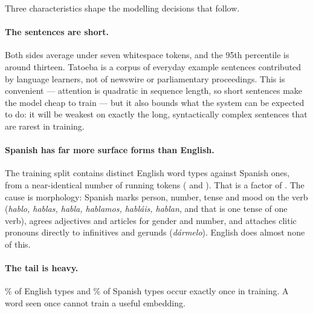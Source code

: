 \documentclass[11pt,a4paper]{article}
\begin{document}
\begin{table}[htbp]
\centering
\caption{Corpus statistics after cleaning. Subword counts use the joint
\SubwordVocab-entry BPE model fitted on the training split only.}
\label{tab:dataset}
\small

\end{table}

Three characteristics shape the modelling decisions that follow.

\paragraph{The sentences are short.} Both sides average under seven whitespace
tokens, and the 95th percentile is around thirteen. Tatoeba is a corpus of
everyday example sentences contributed by language learners, not of newswire or
parliamentary proceedings. This is convenient --- attention is quadratic in
sequence length, so short sentences make the model cheap to train --- but it
also bounds what the system can be expected to do: it will be weakest on
exactly the long, syntactically complex sentences that are rarest in training.

\paragraph{Spanish has far more surface forms than English.} The training split
contains \TypesEn{} distinct English word types against \TypesEs{} Spanish
ones, from a near-identical number of running tokens (\TokensEn{} and
\TokensEs{}). That is a factor of \TypeRatio{}. The cause is morphology:
Spanish marks person, number, tense and mood on the verb (\emph{hablo, hablas,
habla, hablamos, habláis, hablan}, and that is one tense of one verb), agrees
adjectives and articles for gender and number, and attaches clitic pronouns
directly to infinitives and gerunds (\emph{dármelo}). English does almost none
of this.

\paragraph{The tail is heavy.} \HapaxEnPercent\% of English types and
\HapaxEsPercent\% of Spanish types occur exactly once in training. A word seen
once cannot train a useful embedding.

\end{document}
